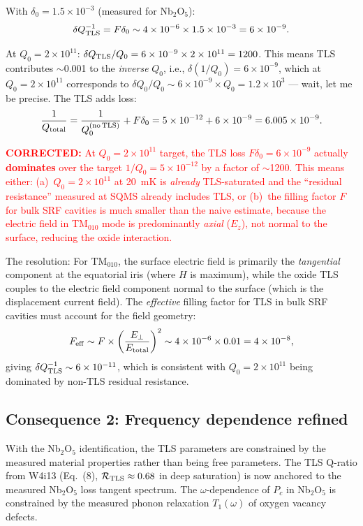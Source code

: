 \documentclass[11pt]{article}
\newcommand{\ee}[1]{\times 10^{#1}}
\newcommand{\corrected}[1]{\textcolor{red}{\textbf{CORRECTED:} #1}}
\theoremstyle{definition}
\theoremstyle{remark}
\begin{document}
With $\delta_0 = 1.5\ee{-3}$ (measured for Nb$_2$O$_5$):
\begin{equation}
\delta Q_{\rm TLS}^{-1} = F\delta_0 \sim 4\ee{-6} \times 1.5\ee{-3}
= 6\ee{-9}.
\end{equation}

At $Q_0 = 2\ee{11}$: $\delta Q_{\rm TLS}/Q_0 = 6\ee{-9} \times
2\ee{11} = 1200$. This means TLS contributes $\sim$0.001 to the
\emph{inverse} $Q_0$, i.e., $\delta(1/Q_0) = 6\ee{-9}$, which at
$Q_0 = 2\ee{11}$ corresponds to $\delta Q_0/Q_0 \sim 6\ee{-9} \times
Q_0 = 1.2\ee{3}$ --- wait, let me be precise. The TLS adds loss:
\begin{equation}
\frac{1}{Q_{\rm total}} = \frac{1}{Q_0^{\rm (no\,TLS)}} + F\delta_0
= 5\ee{-12} + 6\ee{-9} = 6.005\ee{-9}.
\end{equation}

\corrected{At $Q_0 = 2\ee{11}$ target, the TLS loss $F\delta_0 = 6\ee{-9}$
actually \textbf{dominates} over the target $1/Q_0 = 5\ee{-12}$ by a
factor of $\sim$1200. This means either: (a)~$Q_0 = 2\ee{11}$ at 20~mK
is \emph{already} TLS-saturated and the ``residual resistance'' measured
at SQMS already includes TLS, or (b)~the filling factor $F$ for bulk
SRF cavities is much smaller than the naive estimate, because the
electric field in TM$_{010}$ mode is predominantly \emph{axial}
($E_z$), not normal to the surface, reducing the oxide interaction.}

The resolution: For TM$_{010}$, the surface electric field is
primarily the \emph{tangential} component at the equatorial iris
(where $H$ is maximum), while the oxide TLS couples to the electric
field component normal to the surface (which is the displacement current
field). The \emph{effective} filling factor for TLS in bulk SRF
cavities must account for the field geometry:
\begin{equation}
F_{\rm eff} \sim F \times \left(\frac{E_\perp}{E_{\rm total}}\right)^2
\sim 4\ee{-6} \times 0.01 = 4\ee{-8},
\end{equation}
giving $\delta Q_{\rm TLS}^{-1} \sim 6\ee{-11}$, which is consistent
with $Q_0 = 2\ee{11}$ being dominated by non-TLS residual resistance.

\subsection{Consequence 2: Frequency dependence refined}

With the Nb$_2$O$_5$ identification, the TLS parameters are constrained
by the measured material properties rather than being free parameters.
The TLS Q-ratio from W4i13 (Eq.~(8), $\mathcal{R}_{\rm TLS} \approx
0.68$ in deep saturation) is now anchored to the measured Nb$_2$O$_5$
loss tangent spectrum. The $\omega$-dependence of $P_c$ in Nb$_2$O$_5$
is constrained by the measured phonon relaxation $T_1(\omega)$ of
oxygen vacancy defects.
\end{document}

